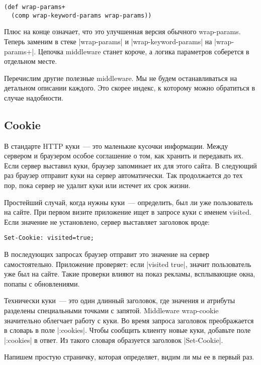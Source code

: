 \begin{verbatim}
(def wrap-params+
  (comp wrap-keyword-params wrap-params))
\end{verbatim}

Плюс на конце означает, что это улучшенная версия обычного wrap-params. Теперь
заменим в стеке \spverb|wrap-params| и \spverb|wrap-keyword-params| на \spverb|wrap-params+|. Цепочка
middleware станет короче, а логика параметров соберется в отдельном месте.

Перечислим другие полезные middleware. Мы не будем останавливаться на детальном
описании каждого. Это скорее индекс, к которому можно обратиться в случае
надобности.

\subsection{Cookie}

В стандарте HTTP куки~--- это маленькие кусочки информации. Между сервером и
браузером особое соглашение о том, как хранить и передавать их. Если сервер
выставил куки, браузер запоминает их для этого сайта. В следующий раз браузер
отправит куки на сервер автоматически. Так продолжается до тех пор, пока сервер
не удалит куки или истечет их срок жизни.

Простейший случай, когда нужны куки~--- определить, был ли уже пользователь на
сайте. При первом визите приложение ищет в запросе куки с именем visited. Если
значение не установлено, сервер выставляет заголовок вроде:

\begin{verbatim}
Set-Cookie: visited=true;
\end{verbatim}

В последующих запросах браузер отправит это значение на сервер
самостоятельно. Приложение проверяет: если \spverb|visited true|, значит пользователь
уже был на сайте. Такие проверки влияют на показ рекламы, всплывающие окна,
попапы с обновлениями.

Технически куки~--- это один длинный заголовок, где значения и атрибуты разделены
специальными точками с запятой. Middleware wrap-cookie значительно облегчает
работу с куки. Во время запроса заголовок преображается в словарь в поле
\spverb|:cookies|. Чтобы сообщить клиенту новые куки, добавьте поле \spverb|:cookies| в
ответ. Из такого словаря образуется заголовок \spverb|Set-Cookie|.

Напишем простую страничку, которая определяет, видим ли мы ее в первый раз.

